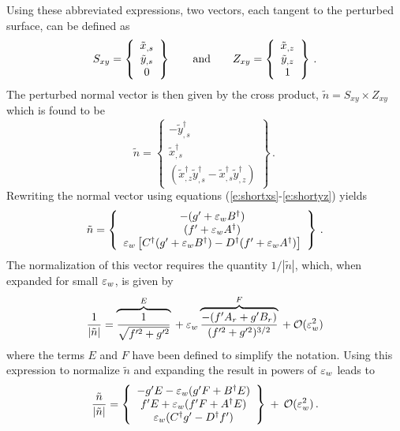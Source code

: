 Using these abbreviated expressions, two vectors, each tangent to the
perturbed surface, can be defined as
%
\begin{equation} 
S_{xy} = \left\{
\begin{array}{c}
\tilde x_{,s} \\ \tilde y_{,s} \\ 0
\end{array}
\right\}  \qquad {\rm and} \qquad
Z_{xy} = \left\{
\begin{array}{c}
\tilde x_{,z} \\ \tilde y_{,z} \\ 1
\end{array}
\right\} {\, .}
\end{equation}
%
The perturbed normal vector is then given by the cross product, $\tilde n =
S_{xy} \times Z_{xy}$ which is found to be
%
\begin{equation}
\tilde n = \left\{
\begin{array}{c}
-\tilde y^\dagger_{,s} \\ \tilde x^\dagger_{,s} \\ 
(\tilde x^\dagger_{,z} \tilde y^\dagger_{,s} - 
 \tilde x^\dagger_{,s} \tilde y^\dagger_{,z})
\end{array}
\right\} \period
\end{equation}
%
Rewriting the normal vector using equations (\ref{e:shortxs}-\ref{e:shortyz})
yields
%
\begin{equation}
\tilde n = \left\{
\begin{array}{c}
-(g' + {\varepsilon_w} B^\dagger) \\ 
 (f' + {\varepsilon_w} A^\dagger) \\ 
{\varepsilon_w} \left[ C^\dagger (g' + {\varepsilon_w} B^\dagger) - 
             D^\dagger (f' + {\varepsilon_w} A^\dagger) \right]
\end{array}
\right\} {\, .}
\end{equation}
%
The normalization of this vector requires the quantity $1/|\tilde n|$, which,
when expanded for small ${\varepsilon_w}$, is given by
%
\begin{equation}
  \frac{1}{|\tilde n|} = \overbrace{\frac{1}{\sqrt{f'^2 + g'^2}}}^E \: + \:
                         {\varepsilon_w} \overbrace{\frac{-( f' A_r + g' B_r )}
			 {(f'^2 + g'^2)^{3/2}}}^F \: + \: {\cal O}(\varepsilon^2_w)
\end{equation}
%
where the terms $E$ and $F$ have been defined to simplify the notation.  Using
this expression to normalize $\tilde n$ and expanding the result in powers of
${\varepsilon_w}$ leads to
%
\begin{equation}
\frac{\tilde n}{|\tilde n|} = \left\{
\begin{array}{c}
-g' E - {\varepsilon_w} (g' F + B^\dagger E) \\ 
 f' E + {\varepsilon_w} (f' F + A^\dagger E) \\ 
{\varepsilon_w} ( C^\dagger g' - D^\dagger f' )
\end{array}
\right\} \: + \: {\cal O}(\varepsilon^2_w) {\, .}
\end{equation}
